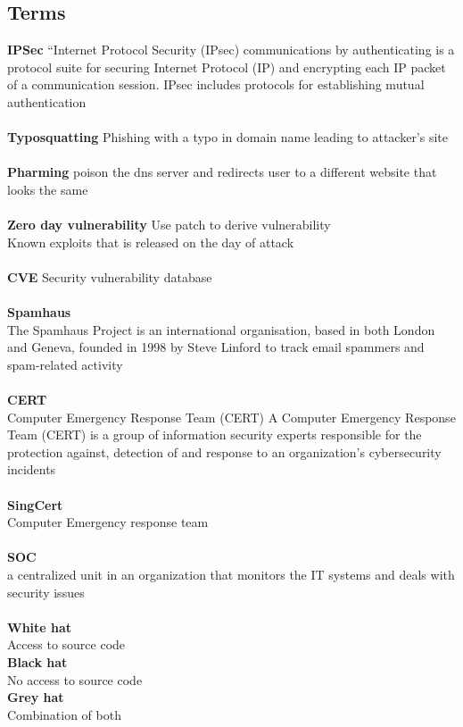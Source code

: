 \documentclass[11pt]{article}
\begin{document}
\begin{multicols*}{3}
\subsection*{Terms}
\textbf{IPSec}
“Internet Protocol Security (IPsec)
communications by authenticating
is a protocol suite for securing Internet Protocol (IP)
and encrypting each IP packet of a communication
session. IPsec includes protocols for establishing mutual authentication \\\\
\textbf{Typosquatting}
Phishing with a typo in domain name leading to attacker's site\\\\
\textbf{Pharming}
poison the dns server and redirects user to a different website that looks the same\\\\
\textbf{Zero day vulnerability}
Use patch to derive vulnerability\\
Known exploits that is released on the day of attack\\\\
\textbf{CVE}
Security vulnerability database\\\\
\textbf{Spamhaus}\\
The Spamhaus Project is an international organisation, based in both London and Geneva, founded in 1998 by Steve Linford to track email spammers and spam-related activity\\\\
\textbf{CERT}\\
Computer Emergency Response Team (CERT) A Computer Emergency Response Team (CERT) is a group of information security experts responsible for the protection against, detection of and response to an organization's cybersecurity incidents\\\\
\textbf{SingCert}\\
Computer Emergency response team\\\\
\textbf{SOC}\\
a centralized unit in an organization that monitors the IT systems and 
deals with security issues\\\\
\textbf{White hat}\\
Access to source code\\
\textbf{Black hat}\\
No access to source code\\
\textbf{Grey hat}\\
Combination of both\\

\end{multicols*}
\end{document}
